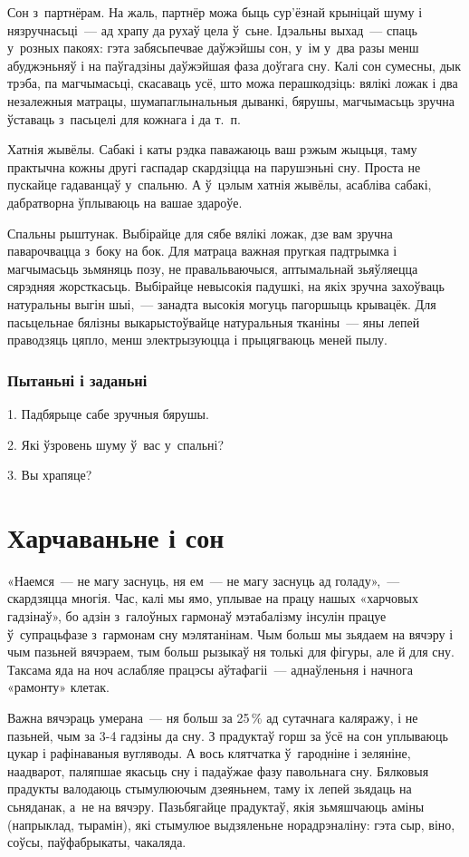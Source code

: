 Сон з~партнёрам. На жаль, партнёр можа быць сур'ёзнай крыніцай шуму і нязручнасьці~--- ад храпу да рухаў цела ў~сьне. Ідэальны выхад~--- спаць у~розных пакоях: гэта забясьпечвае даўжэйшы сон, у~ім у~два разы менш абуджэньняў і на паўгадзіны даўжэйшая фаза доўгага сну. Калі сон сумесны, дык трэба, па магчымасьці, скасаваць усё, што можа перашкодзіць: вялікі ложак і два незалежныя матрацы, шумапаглынальныя дыванкі, бярушы, магчымасьць зручна ўставаць з~пасьцелі для кожнага і да т.~п.

Хатнія жывёлы. Сабакі і каты рэдка паважаюць ваш рэжым жыцьця, таму практычна кожны другі гаспадар скардзіцца на парушэньні сну. Проста не пускайце гадаванцаў у~спальню. А ў~цэлым хатнія жывёлы, асабліва сабакі, дабратворна ўплываюць на вашае здароўе.

Спальны рыштунак. Выбірайце для сябе вялікі ложак, дзе вам зручна паварочвацца з~боку на бок. Для матраца важная пругкая падтрымка і магчымасьць зьмяняць позу, не правальваючыся, аптымальнай зьяўляецца сярэдняя жорсткасьць. Выбірайце невысокія падушкі, на якіх зручна захоўваць натуральны выгін шыі,~--- занадта высокія могуць пагоршыць крывацёк. Для пасьцельнае бялізны выкарыстоўвайце натуральныя тканіны~--- яны лепей праводзяць цяпло, менш электрызуюцца і прыцягваюць меней пылу.

\subsubsection{Пытаньні і заданьні}

1. Падбярыце сабе зручныя бярушы.

2. Які ўзровень шуму ў~вас у~спальні?

3. Вы храпяце?


\section{Харчаваньне і сон}

«Наемся~--- не магу заснуць, ня ем~--- не магу заснуць ад голаду»,~--- скардзяцца многія. Час, калі мы ямо, уплывае на працу нашых «харчовых гадзінаў», бо адзін з~галоўных гармонаў мэтабалізму інсулін працуе ў~супрацьфазе з~гармонам сну мэлятанінам. Чым больш мы зьядаем на вячэру і чым пазьней вячэраем, тым больш рызыкаў ня толькі для фігуры, але й для сну. Таксама яда на ноч аслабляе працэсы аўтафагіі~--- аднаўленьня і начнога «рамонту» клетак.

Важна вячэраць умерана~--- ня больш за 25\,\% ад сутачнага каляражу, і не пазьней, чым за 3-4 гадзіны да сну. З прадуктаў горш за ўсё на сон уплываюць цукар і рафінаваныя вугляводы. А вось клятчатка ў~гародніне і зеляніне, наадварот, паляпшае якасьць сну і падаўжае фазу павольнага сну. Бялковыя прадукты валодаюць стымулюючым дзеяньнем, таму іх лепей зьядаць на сьняданак, а~не на вячэру. Пазьбягайце прадуктаў, якія зьмяшчаюць аміны (напрыклад, тырамін), які стымулюе выдзяленьне норадрэналіну: гэта сыр, віно, соўсы, паўфабрыкаты, чакаляда.

